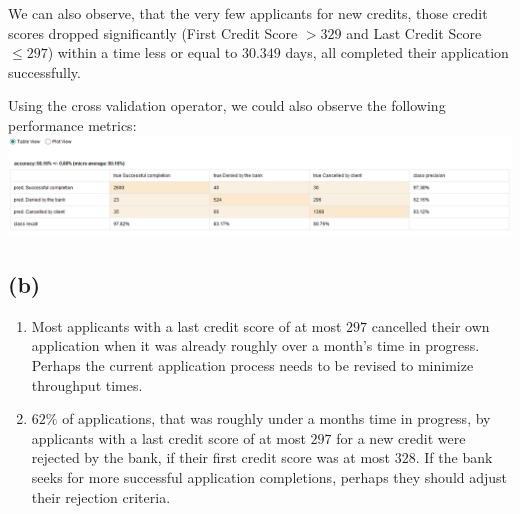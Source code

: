 \documentclass[../main.tex]{subfiles}
\begin{document}
We can also observe, that the very few applicants for new credits, those credit scores dropped significantly (First Credit Score $> 329$ and Last Credit Score $\leq 297$) within a time less or equal to $30.349$ days, all completed their application successfully.

Using the cross validation operator, we could also observe the following performance metrics: \\
\includegraphics[width=\textwidth]{img/RapidMiner_Results_Performance.png}

\subsection*{(b)}
\begin{enumerate}
	\item	Most applicants with a last credit score of at most $297$ cancelled their own application when it was already roughly over a month's time in progress. Perhaps the current application process needs to be revised to minimize throughput times.
	\item	$62\%$ of applications, that was roughly under a months time in progress, by applicants with a last credit score of at most $297$ for a new credit were rejected by the bank, if their first credit score was at most $328$. If the bank seeks for more successful application completions, perhaps they should adjust their rejection criteria.
\end{enumerate}
\end{document}
